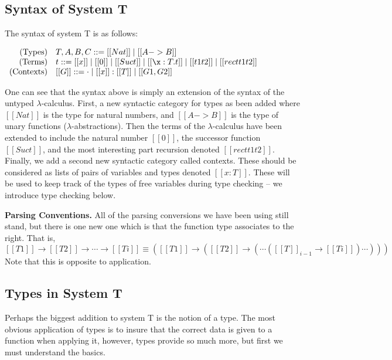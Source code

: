 \documentclass{article}
\begin{document}
\subsection{Syntax of System T}
\label{subsec:syntax}
The syntax of system T is as follows:
\begin{center}
  \begin{math}
    \begin{array}{rll}
      \text{(Types)} & T,A,B,C ::= [[Nat]] \mid [[A -> B]]\\
      \text{(Terms)} & t ::= [[x]] \mid [[0]] \mid [[Suc t]] \mid
      [[\x:T.t]] \mid [[t1 t2]] \mid [[rec t t1 t2]]\\    
      \text{(Contexts)}  & [[G]] ::= \cdot \mid [[x]]:[[T]] \mid [[G1,G2]]\\
    \end{array}
  \end{math}
\end{center}
One can see that the syntax above is simply an extension of the syntax
of the untyped $\lambda$-calculus.  First, a new syntactic category
for types as been added where $[[Nat]]$ is the type for natural
numbers, and $[[A -> B]]$ is the type of unary functions
($\lambda$-abstractions).  Then the terms of the $\lambda$-calculus
have been extended to include the natural number $[[0]]$, the
successor function $[[Suc t]]$, and the most interesting part
recursion denoted $[[rec t t1 t2]]$. Finally, we add a second new
syntactic category called contexts.  These should be considered as
lists of pairs of variables and types denoted $[[x : T]]$.  These will
be used to keep track of the types of free variables during type
checking -- we introduce type checking below.

\textbf{Parsing Conventions.} All of the parsing conversions we have
been using still stand, but there is one new one which is that the
function type associates to the right.  That is,
\[ [[T1]] \to [[T2]] \to \cdots \to [[Ti]] \equiv ([[T1]] \to ([[T2]]
\to (\cdots ([[T]]_{i-1} \to [[Ti]]) \cdots ))) \] Note that this is
opposite to application.

\subsection{Types in System T}
\label{subsec:type_checking}
Perhaps the biggest addition to system T is the notion of a type.  The
most obvious application of types is to insure that the correct data
is given to a function when applying it, however, types provide so
much more, but first we must understand the basics.
\end{document}
